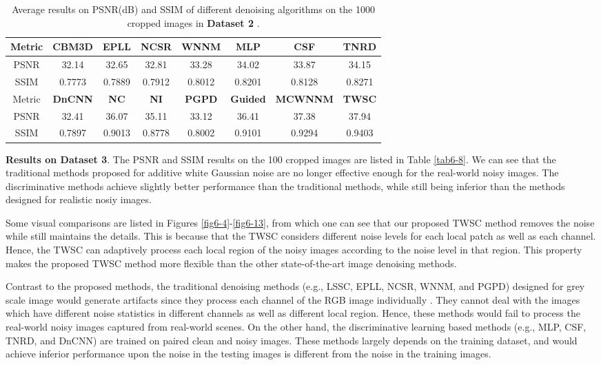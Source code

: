 \begin{table}[hbp]
\caption{Average results on PSNR(dB) and SSIM of different denoising algorithms on the 1000 cropped images in \textbf{Dataset 2} \cite{dnd2017}.}
\scriptsize
\label{tab6-7}
\begin{center}
\renewcommand\arraystretch{1.2}
\begin{tabular*}{1\textwidth}{@{\extracolsep{\fill}}cccccccc}
\hline
Metric
&
\textbf{CBM3D}
&
\textbf{EPLL}
&
\textbf{NCSR}
&
\textbf{WNNM}
&
\textbf{MLP}
&
\textbf{CSF}
&
\textbf{TNRD}
\\
\hline
PSNR & 32.14 &  32.65 & 32.81 & 33.28  & 34.02  & 33.87  & 34.15
\\
\hline
SSIM & 0.7773 & 0.7889  & 0.7912  & 0.8012  &  0.8201 & 0.8128  & 0.8271
\\
\hline
Metric

&
\textbf{DnCNN}
&
\textbf{NC}
&
\textbf{NI}
&
\textbf{PGPD}
&
\textbf{Guided}
&
\textbf{MCWNNM}
&
\textbf{TWSC}
\\
\hline
PSNR & 32.41 & 36.07 & 35.11 & 33.12 & 36.41 & 37.38 &  37.94
\\
\hline
SSIM & 0.7897 & 0.9013 & 0.8778 & 0.8002 & 0.9101 & 0.9294 &  0.9403
\\
\hline
\end{tabular*}
\end{center}
\end{table}


\textbf{Results on Dataset 3}.
The PSNR and SSIM \cite{ssim} results on the 100 cropped images are listed in Table \ref{tab6-8}. We can see that the traditional methods proposed for additive white Gaussian noise are no longer effective enough for the real-world noisy images. The discriminative methods achieve slightly better performance than the traditional methods, while still being inferior than the methods designed for realistic nosiy images.

Some visual comparisons are listed in Figures \ref{fig6-4}-\ref{fig6-13}, from which one can see that our proposed TWSC method removes the noise while still maintains the details. This is because that the TWSC considers different noise levels for each local patch as well as each channel. Hence, the TWSC can adaptively process each local region of the noisy images according to the noise level in that region. This property makes the proposed TWSC method more flexible than the other state-of-the-art image denoising methods. 

Contrast to the proposed methods, the traditional denoising methods (e.g., LSSC, EPLL, NCSR, WNNM, and PGPD) designed for grey scale image would generate artifacts since they process each channel of the RGB image individually \cite{srcolor}. They cannot deal with the images which have different noise statistics in different channels as well as different local region. Hence, these methods would fail to process the real-world noisy images captured from real-world scenes. On the other hand, the discriminative learning based methods (e.g., MLP, CSF, TNRD, and DnCNN) are trained on paired clean and noisy images. These methods largely depends on the training dataset, and would achieve inferior performance upon the noise in the testing images is different from the noise in the training images.

